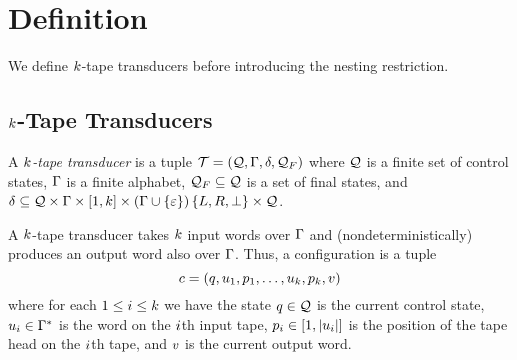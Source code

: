 
\section{Definition}

We define $k$-tape transducers before introducing the nesting restriction.


\subsection{$k$-Tape Transducers}

\begin{definition}
    A \emph{$k$-tape transducer} is a tuple
    $\mathcal{T} = \left(\mathcal{Q}, \Gamma, \delta, \mathcal{Q}_F\right)$
    where
        $\mathcal{Q}$ is a finite set of control states,
        $\Gamma$ is a finite alphabet,
        $\mathcal{Q}_F \subseteq \mathcal{Q}$ is a set of final states, and
        $\delta \subseteq
            \mathcal{Q} \times
            \Gamma \times [1, k] \times
            \left(\Gamma \cup \left\{\varepsilon\right\}\right)
            \left\{L, R, \bot\right\} \times \mathcal{Q}$.
\end{definition}

A $k$-tape transducer takes $k$ input words over $\Gamma$ and (nondeterministically) produces an output word also over $\Gamma$.
Thus, a configuration is a tuple
\[
    c =
    \left(
        q,
        u_1, p_1,
        \ldots,
        u_k, p_k,
        v
    \right)
\]
where for each
$1 \leq i \leq k$
we have
    the state $q \in \mathcal{Q}$ is the current control state,
    $u_i \in \Gamma^\ast$
        is the word on the $i$th input tape,
    $p_i \in [1, \left|u_i\right|]$
        is the position of the tape head on the $i$th tape, and
    $v$ is the current output word.

